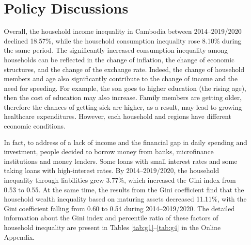 \documentclass[11pt,letterpaper]{article}
\begin{document}
\section{Policy Discussions}

Overall, the household income inequality in Cambodia between 2014--2019/2020 declined 18.57\%, while the household consumption inequality rose 8.10\% during the same period. The significantly increased consumption inequality among households can be reflected in the change of inflation, the change of economic structures, and the change of the exchange rate. Indeed, the change of household members and age also significantly contribute to the change of income and the need for speeding. For example, the son goes to higher education (the rising age), then the cost of education may also increase. Family members are getting older, therefore the chances of getting sick are higher, as a result, may lead to growing healthcare expenditures. However, each household and regions have different economic conditions. 

In fact, to address of a lack of income and the financial gap in daily spending and investment, people decided to borrow money from banks, microfinance institutions and money lenders. Some loans with small interest rates and some taking loans with high-interest rates. By 2014--2019/2020, the household inequality through liabilities grew 3.77\%, which increased the Gini index from 0.53 to 0.55. At the same time, the results from the Gini coefficient find that the household wealth inequality based on maturing assets decreased 11.11\%, with the Gini coefficient falling from 0.60 to 0.54 during 2014--2019/2020. The detailed information about the Gini index and percentile ratio of these factors of household inequality are present in Tables \ref{tab:g1}--\ref{tab:g4} in the Online Appendix.
\end{document}
